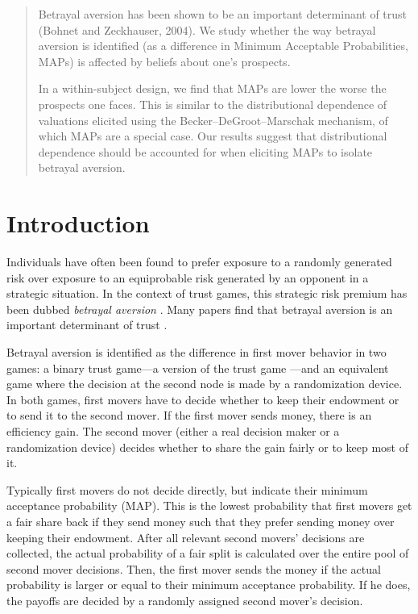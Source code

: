 \begin{titlepage}
\begin{abstract}
Betrayal aversion has been shown to be an important determinant of trust (Bohnet and Zeckhauser, 2004).
We study whether the way betrayal aversion is identified (as a difference in Minimum Acceptable Probabilities, MAPs) is affected by beliefs about one’s prospects.

In a within-subject design, we find that MAPs are lower the worse the prospects one faces.
This is similar to the distributional dependence of valuations elicited using the Becker–DeGroot–Marschak mechanism, of which MAPs are a special case.
Our results suggest that distributional dependence should be accounted for when eliciting MAPs to isolate betrayal aversion.

\end{abstract}
\end{titlepage}


\section{Introduction}\label{sec:intro}
Individuals have often been found to prefer exposure to a randomly generated risk over exposure to an equiprobable risk generated by an opponent in a strategic situation.
In the context of trust games, this strategic risk premium has been dubbed \textit{betrayal aversion} \citep{Bohnet2004}.
Many papers find that betrayal aversion is an important determinant of trust \citep{Bohnet2004, Aimone2015, Fairley2016, Quercia2016, Bacine2018, Butler2018, Polipciuc2022motive}.

Betrayal aversion is identified as the difference in first mover behavior in two games: a binary trust game---a version of the trust game \citep{Berg1995}---and an equivalent game where the decision at the second node is made by a randomization device.
In both games, first movers have to decide whether to keep their endowment or to send it to the second mover.
If the first mover sends money, there is an efficiency gain.
The second mover (either a real decision maker or a randomization device) decides whether to share the gain fairly or to keep most of it.

Typically first movers do not decide directly, but indicate their minimum acceptance probability (MAP).
This is the lowest probability that first movers get a fair share back if they send money such that they prefer sending money over keeping their endowment.
After all relevant second movers' decisions are collected, the actual probability of a fair split is calculated over the entire pool of second mover decisions.
Then, the first mover sends the money if the actual probability is larger or equal to their minimum acceptance probability.
If he does, the payoffs are decided by a randomly assigned second mover's decision.

